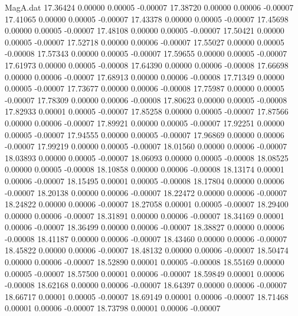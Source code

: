 \begin{filecontents}{MagA.dat}
  17.36424    0.00000    0.00005   -0.00007
  17.38720    0.00000    0.00006   -0.00007
  17.41065    0.00000    0.00005   -0.00007
  17.43378    0.00000    0.00005   -0.00007
  17.45698    0.00000    0.00005   -0.00007
  17.48108    0.00000    0.00005   -0.00007
  17.50421    0.00000    0.00005   -0.00007
  17.52718    0.00000    0.00006   -0.00007
  17.55027    0.00000    0.00005   -0.00008
  17.57343    0.00000    0.00005   -0.00007
  17.59655    0.00000    0.00005   -0.00007
  17.61973    0.00000    0.00005   -0.00008
  17.64390    0.00000    0.00006   -0.00008
  17.66698    0.00000    0.00006   -0.00007
  17.68913    0.00000    0.00006   -0.00008
  17.71349    0.00000    0.00005   -0.00007
  17.73677    0.00000    0.00006   -0.00008
  17.75987    0.00000    0.00005   -0.00007
  17.78309    0.00000    0.00006   -0.00008
  17.80623    0.00000    0.00005   -0.00008
  17.82933    0.00001    0.00005   -0.00007
  17.85258    0.00000    0.00005   -0.00007
  17.87566    0.00000    0.00006   -0.00007
  17.89921    0.00000    0.00005   -0.00007
  17.92251    0.00000    0.00005   -0.00007
  17.94555    0.00000    0.00005   -0.00007
  17.96869    0.00000    0.00006   -0.00007
  17.99219    0.00000    0.00005   -0.00007
  18.01560    0.00000    0.00006   -0.00007
  18.03893    0.00000    0.00005   -0.00007
  18.06093    0.00000    0.00005   -0.00008
  18.08525    0.00000    0.00005   -0.00008
  18.10858    0.00000    0.00006   -0.00008
  18.13174    0.00001    0.00006   -0.00007
  18.15495    0.00001    0.00005   -0.00008
  18.17804    0.00000    0.00006   -0.00007
  18.20138    0.00000    0.00006   -0.00007
  18.22472    0.00000    0.00006   -0.00007
  18.24822    0.00000    0.00006   -0.00007
  18.27058    0.00001    0.00005   -0.00007
  18.29400    0.00000    0.00006   -0.00007
  18.31891    0.00000    0.00006   -0.00007
  18.34169    0.00001    0.00006   -0.00007
  18.36499    0.00000    0.00006   -0.00007
  18.38827    0.00000    0.00006   -0.00008
  18.41187    0.00000    0.00006   -0.00007
  18.43460    0.00000    0.00006   -0.00007
  18.45822    0.00000    0.00006   -0.00007
  18.48132    0.00000    0.00006   -0.00007
  18.50474    0.00000    0.00006   -0.00007
  18.52890    0.00001    0.00005   -0.00008
  18.55169    0.00000    0.00005   -0.00007
  18.57500    0.00001    0.00006   -0.00007
  18.59849    0.00001    0.00006   -0.00008
  18.62168    0.00000    0.00006   -0.00007
  18.64397    0.00000    0.00006   -0.00007
  18.66717    0.00001    0.00005   -0.00007
  18.69149    0.00001    0.00006   -0.00007
  18.71468    0.00001    0.00006   -0.00007
  18.73798    0.00001    0.00006   -0.00007

\end{filecontents}
